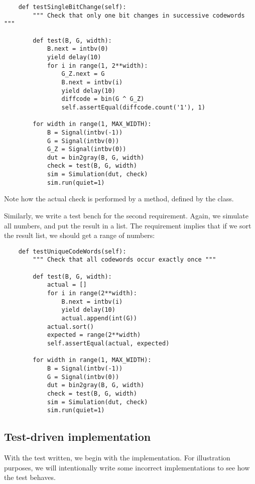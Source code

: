 \begin{verbatim}
    def testSingleBitChange(self):
        """ Check that only one bit changes in successive codewords """
        
        def test(B, G, width):
            B.next = intbv(0)
            yield delay(10)
            for i in range(1, 2**width):
                G_Z.next = G
                B.next = intbv(i)
                yield delay(10)
                diffcode = bin(G ^ G_Z)
                self.assertEqual(diffcode.count('1'), 1)
        
        for width in range(1, MAX_WIDTH):
            B = Signal(intbv(-1))
            G = Signal(intbv(0))
            G_Z = Signal(intbv(0))
            dut = bin2gray(B, G, width)
            check = test(B, G, width)
            sim = Simulation(dut, check)
            sim.run(quiet=1)
\end{verbatim}

Note how the actual check is performed by a 
method, defined by the  class.

Similarly, we write a test bench for the second requirement. Again, we
simulate all numbers, and put the result in a list. The requirement
implies that if we sort the result list, we should get a range of
numbers:

\begin{verbatim}
    def testUniqueCodeWords(self):
        """ Check that all codewords occur exactly once """

        def test(B, G, width):
            actual = []
            for i in range(2**width):
                B.next = intbv(i)
                yield delay(10)
                actual.append(int(G))
            actual.sort()
            expected = range(2**width)
            self.assertEqual(actual, expected)
       
        for width in range(1, MAX_WIDTH):
            B = Signal(intbv(-1))
            G = Signal(intbv(0))
            dut = bin2gray(B, G, width)
            check = test(B, G, width)
            sim = Simulation(dut, check)
            sim.run(quiet=1)
\end{verbatim}


\subsection{Test-driven implementation}

With the test written, we begin with the implementation. For
illustration purposes, we will intentionally write some incorrect
implementations to see how the test behaves.

